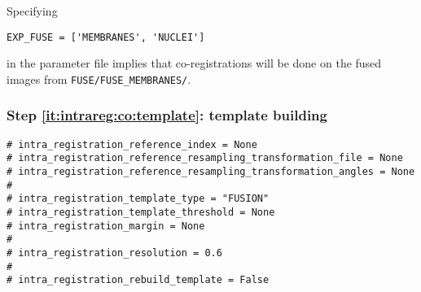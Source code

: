Specifying
\begin{verbatim}
EXP_FUSE = ['MEMBRANES', 'NUCLEI']
\end{verbatim}
in the parameter file implies that co-registrations will be done on
the fused images from \texttt{FUSE/FUSE\_MEMBRANES/}.



\subsubsection{Step \ref{it:intrareg:co:template}: template building}
\label{sec:cli:intraregistration:template}

\begin{verbatim}
# intra_registration_reference_index = None
# intra_registration_reference_resampling_transformation_file = None
# intra_registration_reference_resampling_transformation_angles = None
#
# intra_registration_template_type = "FUSION"
# intra_registration_template_threshold = None
# intra_registration_margin = None
#
# intra_registration_resolution = 0.6
#
# intra_registration_rebuild_template = False
\end{verbatim}

